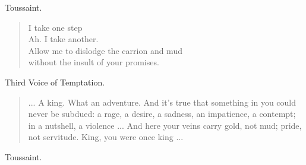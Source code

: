 \documentclass[letterpaper,article,12pt,oneside,notitlepage]{memoir}
\begin{document}
\clearpage

\begin{center}Toussaint.\end{center}

\begin{verse}
I take one step \\
Ah. I take another. \\
Allow me to dislodge the carrion and mud \\
without the insult of your promises. \\
\end{verse}

\begin{center}Third Voice of Temptation.\end{center}

\begin{verse}
\indent ... A king. What an adventure. And it's true that something in you could never be subdued: a rage, a desire, a sadness, an impatience, a contempt; in a nutshell, a violence ... And here your veins carry gold, not mud; pride, not servitude. King, you were once king ... \\
\end{verse}

\begin{center}Toussaint.\end{center}
\end{document}
